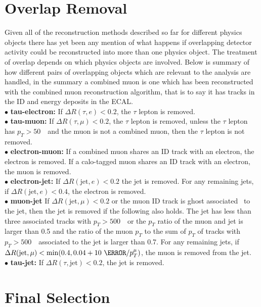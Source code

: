 \section{Overlap Removal}
Given all of the reconstruction methods described so far for different physics
objects there has yet been any mention of what happens if overlapping detector
activity could be reconstructed into more than one physics object. The treatment
of overlap depends on which physics objects are involved. Below is summary of
how different pairs of overlapping objects which are relevant to the analysis
are handled, in the summary a combined muon is one which has been reconstructed
with the combined muon reconstruction algorithm, that is to say it has tracks in
the ID and energy deposits in the ECAL.\\
$\bullet$ \textbf{tau-electron:} If $\Delta R(\tau,e)<0.2$, the $\tau$ lepton is
removed.\\
%
$\bullet$ \textbf{tau-muon:} If $\Delta R(\tau,\mu)<0.2$, the $\tau$ lepton is
removed, unless the $\tau$ lepton has $p_T>50$~\GeV\ and the muon is not a combined
muon, then the $\tau$ lepton is not removed.\\
%
$\bullet$ \textbf{electron-muon:} If a combined muon shares an ID track with an
electron, the electron is removed. If a calo-tagged muon shares an ID track with
an electron, the muon is removed.\\
%
$\bullet$ \textbf{electron-jet:} If $\Delta R(\text{jet},e)<0.2$ the jet is
removed. For any remaining jets, if $\Delta R(\text{jet},e)<0.4$, the
electron is removed.\\
%
$\bullet$ \textbf{muon-jet} If $\Delta R(\text{jet},\mu)<0.2$ or the muon ID
track is ghost associated~\cite{PER-2012-02, Caccciari_2008, CACCIARI2008119} to
the jet, then the jet is removed if the following also holds. The jet has less
than three associated tracks with $p_T > 500$~\MeV\ or the $p_T$ ratio of the muon
and jet is larger than 0.5 and the ratio of the muon $p_T$ to the sum of $p_T$
of tracks with $p_T > 500$~\MeV\ associated to the jet is larger than 0.7. For
any remaining jets, if $\Delta R(\text{jet},\mu)<\min(0.4, 0.04 + 10\ \GeV /
p_T^{\mu})$, the muon is removed from the jet.\\
%
$\bullet$ \textbf{tau-jet:} If $\Delta R(\tau,\text{jet})<0.2$, the jet is
removed.

\section{Final Selection}
\label{sec:selection}

